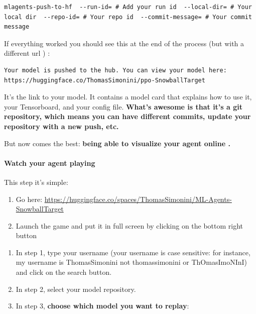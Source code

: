 \documentclass[11pt,a4paper]{article}
\begin{document}
\begin{lstlisting}
mlagents-push-to-hf  --run-id= # Add your run id  --local-dir= # Your local dir  --repo-id= # Your repo id  --commit-message= # Your commit message
\end{lstlisting}

If everything worked you should see this at the end of the process (but with a different url ) :

\begin{lstlisting}
Your model is pushed to the hub. You can view your model here: https://huggingface.co/ThomasSimonini/ppo-SnowballTarget
\end{lstlisting}

It's the link to your model. It contains a model card that explains how to use it, your Tensorboard, and your config file. \textbf{What's awesome is that it's a git repository, which means you can have different commits, update your repository with a new push, etc.}

But now comes the best: \textbf{being able to visualize your agent online .}

\paragraph{Watch your agent playing}\label{watch-your-agent-playing}

This step it's simple:

\begin{enumerate}
\def\labelenumi{\arabic{enumi}.}
\item
  Go here: \url{https://huggingface.co/spaces/ThomasSimonini/ML-Agents-SnowballTarget}
\item
  Launch the game and put it in full screen by clicking on the bottom right button
\end{enumerate}


\begin{enumerate}
\def\labelenumi{\arabic{enumi}.}
\item
  In step 1, type your username (your username is case sensitive: for instance, my username is ThomasSimonini not thomassimonini or ThOmasImoNInI) and click on the search button.
\item
  In step 2, select your model repository.
\item
  In step 3, \textbf{choose which model you want to replay}:
\end{enumerate}
\end{document}
